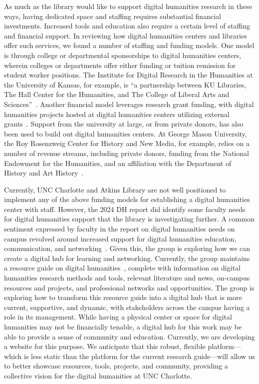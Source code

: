 \documentclass[final]{anthology-ch}
\begin{document}
As much as the library would like to support digital humanities research in these ways, having dedicated space and staffing requires substantial financial investments. Increased tools and education also require a certain level of staffing and financial support. In reviewing how digital humanities centers and libraries offer such services, we found a number of staffing and funding models. One model is through college or departmental sponsorships to digital humanities centers, wherein colleges or departments offer either funding or tuition remission for student worker positions. The Institute for Digital Research in the Humanities at the University of Kansas, for example, is \enquote{a partnership between KU Libraries, The Hall Center for the Humanities, and The College of Liberal Arts and Sciences}~\cite{kansashistory}. Another financial model leverages research grant funding, with digital humanities projects hosted at digital humanities centers utilizing external grants~\cite{gayman2019digital}. Support from the university at large, or from private donors, has also been used to build out digital humanities centers. At George Mason University, the Roy Rosenzweig Center for History and New Media, for example, relies on a number of revenue streams, including private donors, funding from the National Endowment for the Humanities, and an affiliation with the Department of History and Art History~\cite{rrchnmstory}.

Currently, UNC Charlotte and Atkins Library are not well positioned to implement any of the above funding models for establishing a digital humanities center with staff. However, the 2024 DH report did identify some faculty needs for digital humanities support that the library is investigating further. A common sentiment expressed by faculty in the report on digital humanities needs on campus revolved around increased support for digital humanities education, communication, and networking~\cite[p.~2]{anderson2024investigating}. Given this, the group is exploring how we can create a digital hub for learning and networking. Currently, the group maintains a resource guide on digital humanities~\cite{atkinsdh}, complete with information on digital humanities research methods and tools, relevant literature and news, on-campus resources and projects, and professional networks and opportunities. The group is exploring how to transform this resource guide into a digital hub that is more current, supportive, and dynamic, with stakeholders across the campus having a role in its management. While having a physical center or space for digital humanities may not be financially tenable, a digital hub for this work may be able to provide a sense of community and education. Currently, we are developing a website for this purpose. We anticipate that this robust, flexible platform---which is less static than the platform for the current research guide---will allow us to better showcase resources, tools, projects, and community, providing a collective vision for the digital humanities at UNC Charlotte.
\end{document}
